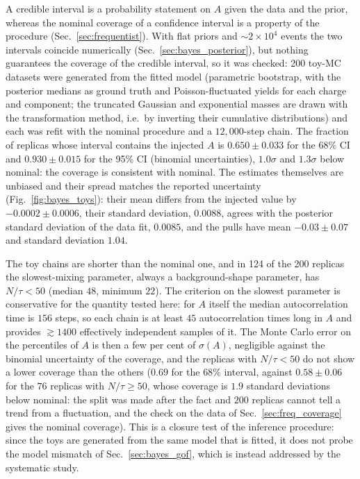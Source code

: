 A credible interval is a probability statement on $A$ given the data and the prior, whereas the nominal coverage of a confidence interval is a property of the procedure (Sec.~\ref{sec:frequentist}). With flat priors and $\sim2\times10^4$ events the two intervals coincide numerically (Sec.~\ref{sec:bayes_posterior}), but nothing guarantees the coverage of the credible interval, so it was checked: 200 toy-MC datasets were generated from the fitted model (parametric bootstrap, with the posterior medians as ground truth and Poisson-fluctuated yields for each charge and component; the truncated Gaussian and exponential masses are drawn with the transformation method, i.e.\ by inverting their cumulative distributions) and each was refit with the nominal procedure and a $12{,}000$-step chain. The fraction of replicas whose interval contains the injected $A$ is $0.650\pm0.033$ for the 68\% CI and $0.930\pm0.015$ for the 95\% CI (binomial uncertainties), $1.0\sigma$ and $1.3\sigma$ below nominal: the coverage is consistent with nominal. The estimates themselves are unbiased and their spread matches the reported uncertainty (Fig.~\ref{fig:bayes_toys}): their mean differs from the injected value by $-0.0002\pm0.0006$, their standard deviation, $0.0088$, agrees with the posterior standard deviation of the data fit, $0.0085$, and the pulls have mean $-0.03\pm0.07$ and standard deviation $1.04$.

The toy chains are shorter than the nominal one, and in 124 of the 200 replicas the slowest-mixing parameter, always a background-shape parameter, has $N/\tau<50$ (median $48$, minimum $22$). The criterion on the slowest parameter is conservative for the quantity tested here: for $A$ itself the median autocorrelation time is $156$ steps, so each chain is at least $45$ autocorrelation times long in $A$ and provides $\gtrsim1400$ effectively independent samples of it. The Monte Carlo error on the percentiles of $A$ is then a few per cent of $\sigma(A)$, negligible against the binomial uncertainty of the coverage, and the replicas with $N/\tau<50$ do not show a lower coverage than the others ($0.69$ for the $68\%$ interval, against $0.58\pm0.06$ for the $76$ replicas with $N/\tau\geq50$, whose coverage is $1.9$ standard deviations below nominal: the split was made after the fact and $200$ replicas cannot tell a trend from a fluctuation, and the check on the data of Sec.~\ref{sec:freq_coverage} gives the nominal coverage). This is a closure test of the inference procedure: since the toys are generated from the same model that is fitted, it does not probe the model mismatch of Sec.~\ref{sec:bayes_gof}, which is instead addressed by the systematic study.


